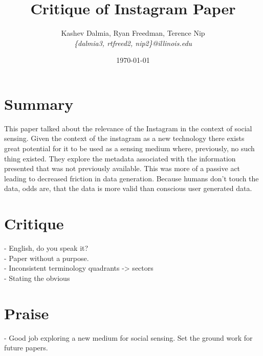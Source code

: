 \documentclass[a4paper]{article}
\title{Critique of Instagram Paper}
\author{Kashev Dalmia, Ryan Freedman, Terence Nip \\
        \textit{\{dalmia3, rtfreed2, nip2\}@illinois.edu}
       }
\date{\today}
\begin{document}
\maketitle

\section{Summary}
This paper talked about the relevance of the Instagram in the context of social sensing. Given the context of the instagram as a new technology there exists great potential for it to be used as a sensing medium where, previously, no such thing existed. They explore the metadata associated with the information presented that was not previously available. This was more of a passive act leading to decreased friction in data generation. Because humans don't touch the data, odds are, that the data is more valid than conscious user generated data. 

\section{Critique}

- English, do you speak it? \\
- Paper without a purpose. \\
- Inconsistent terminology quadrants -> sectors \\
- Stating the obvious \\

\section{Praise}
- Good job exploring a new medium for social sensing. Set the ground work for future papers.
\end{document}
